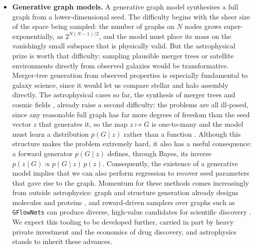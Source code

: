 \documentclass[graybox, envcountchap]{Template/svmult}
\begin{document}
\begin{itemize}
    \item \textbf{Generative graph models.} A generative graph model synthesises a full graph from a lower-dimensional seed. The difficulty begins with the sheer size of the space being sampled: the number of graphs on $N$ nodes grows super-exponentially, as $2^{N(N-1)/2}$, and the model must place its mass on the vanishingly small subspace that is physically valid. But the astrophysical prize is worth that difficulty: sampling plausible merger trees or satellite environments directly from observed galaxies would be transformative. Merger-tree generation from observed properties is especially fundamental to galaxy science, since it would let us compare stellar and halo assembly directly. The astrophysical cases so far, the synthesis of merger trees and cosmic fields \citep{Tang2022_merger_normalizingflow, Jagvaral2022_intrinsicalignment_GNN, Nguyen2024_FLORAH_assembly, Nguyen2025_mergertree_generative, Nguyen2026_DREAMS_diffusion, Onutu2025_scorematching_cosmology}, already raise a second difficulty: the problems are all ill-posed, since any reasonable full graph has far more degrees of freedom than the seed vector $z$ that generates it, so the map $z \mapsto G$ is one-to-many and the model must learn a distribution $p(G \mid z)$ rather than a function \citep{Vignac2023_DiGress}. Although this structure makes the problem extremely hard, it also has a useful consequence: a forward generator $p(G\mid z)$ defines, through Bayes, its inverse $p(z\mid G) \propto p(G\mid z)\,p(z)$. Consequently, the existence of a generative model implies that we can also perform regression to recover seed parameters that gave rise to the graph. Momentum for these methods comes increasingly from outside astrophysics: graph and structure generation already designs molecules and proteins \citep{Hoogeboom2022_EDM_molecules, Watson2023_RFdiffusion}, and reward-driven samplers over graphs such as \texttt{GFlowNets} can produce diverse, high-value candidates for scientific discovery \citep{Bengio2021_GFlowNet, Jain2022_GFlowNet_biological, Bengio2023_GFlowNet_foundations}. We expect this tooling to be developed further, carried in part by heavy private investment and the economics of drug discovery, and astrophysics stands to inherit these advances.

\end{itemize}
\end{document}
